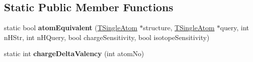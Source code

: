 \subsection*{Static Public Member Functions}
\begin{DoxyCompactItemize}
\item 
\hypertarget{class_open_babel_1_1_t_single_atom_a57455e94ee01c1feff12e30023d18f6b}{static bool {\bfseries atom\-Equivalent} (\hyperlink{class_open_babel_1_1_t_single_atom}{T\-Single\-Atom} $\ast$structure, \hyperlink{class_open_babel_1_1_t_single_atom}{T\-Single\-Atom} $\ast$query, int n\-H\-Str, int n\-H\-Query, bool charge\-Sensitivity, bool isotope\-Sensitivity)}\label{class_open_babel_1_1_t_single_atom_a57455e94ee01c1feff12e30023d18f6b}

\item 
\hypertarget{class_open_babel_1_1_t_single_atom_a6d71ea707a4f361dd330c2286ac43c47}{static int {\bfseries charge\-Delta\-Valency} (int atom\-No)}\label{class_open_babel_1_1_t_single_atom_a6d71ea707a4f361dd330c2286ac43c47}

\end{DoxyCompactItemize}
